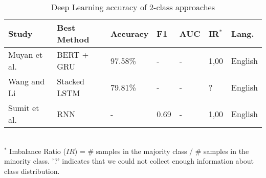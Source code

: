 \begin{table}[ht]
    \caption{Deep Learning accuracy of 2-class approaches }
    \label{tab:DL_performance_2class}
    \centering
    \begin{tabular}{l l l l l l l}
        \toprule
        \textbf{Study} & \textbf{Best Method} & \textbf{Accuracy} & \textbf{F1} & \textbf{AUC} & \textbf{IR$^*$} & \textbf{Lang.} \\ 
        \midrule
        Muyan et al.~\cite{Li2022_lr2019} & BERT + GRU & 97.58\% & - & - & 1,00 & English \\
        Wang and Li~\cite{Wang2020_lr26} &  Stacked LSTM & 79.81\% & - & - & ? & English \\
        Sumit et al.~\cite{Asthana2021_lr76} & RNN & - & 0.69 & - & 1,00 & English \\
        \bottomrule
    \end{tabular}
    \\ \vspace{0.1cm}
    \footnotesize
    $^*$ Imbalance Ratio ($IR$) = \# samples in the majority class / \# samples in the minority class. '?' indicates that we could not collect enough information about class distribution.
\end{table}